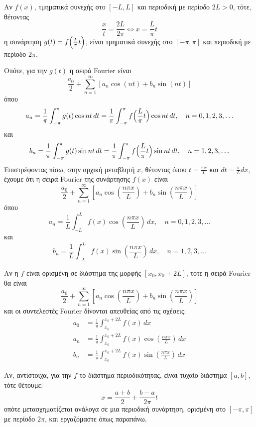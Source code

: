 \begin{rem}
  Αν $ f(x) $, τμηματικά συνεχής στο $ [-L, L] $ και περιοδική  με περίοδο 
  $ 2L>0 $, τότε, θέτοντας 
  \[ 
    \frac{x}{t} = \frac{2L}{2 \pi} \Leftrightarrow \boxed{x= \frac{L}{\pi} t}
  \]
  η συνάρτηση $ g(t) = f\Bigl(\frac{L}{\pi}t\Bigr) $, είναι τμηματικά συνεχής στο 
  $ [- \pi , \pi] $ και περιοδική με περίοδο $ 2 \pi $.
\end{rem}
Οπότε, για την $ g(t) $ η σειρά Fourier είναι 
\[
  \frac{a_{0}}{2} + \sum_{n=1}^{\infty} [a_{n} \cos{(nt)} + b_{n} \sin{(nt)}]
\] 
όπου 
\[
  a_{n} = \frac{1}{\pi} \int _{- \pi}^{\pi} g(t) \cos{nt} \,{dt} = 
  \frac{1}{\pi} \int _{- \pi}^{\pi} f\Bigl(\frac{L}{\pi} t\Bigr) \cos{nt} \,{dt}, 
  \quad n = 0,1,2,3, \ldots
\] 
και 
\[
  b_{n} = \frac{1}{\pi} \int _{- \pi}^{\pi} g(t) \sin{nt} \,{dt} = 
  \frac{1}{\pi} \int _{- \pi}^{\pi} f\Bigl(\frac{L}{\pi} t\Bigr) \sin{nt} \,{dt}, 
  \quad n = 1,2,3, \ldots
\]
Επιστρέφοντας πίσω, στην αρχική μεταβλητή $x$, θέτοντας όπου $ t = \frac{\pi x}{L} $ 
και $ dt = \frac{\pi}{L} dx $, έχουμε ότι η σειρά Fourier της συνάρτησης $ f(x) $ είναι
\[
  \boxed{\frac{a_{0}}{2} + \sum_{n=1}^{\infty} \left[a_{n} 
      \cos{\left(\frac{n \pi x}{L}\right)} + b_{n} 
  \sin{\left(\frac{n \pi x}{L}\right)} \right]}
\]
όπου 
\[
  a_{n} = \frac{1}{L} \int _{- L}^{L} f(x) 
  \cos{\left(\frac{n \pi x}{L}\right)} \,{dx}, \quad n = 0,1,2,3, \ldots
\] 
και 
\[
  b_{n} = \frac{1}{L} \int _{- L}^{L} f(x) 
  \sin{\left(\frac{n \pi x}{L}\right)} \,{dx}, \quad n = 1,2,3, \ldots
\]

\begin{rem}
  Αν η $f$ είναι ορισμένη σε διάστημα της μορφής $ [x_{0}, x_{0}+2L] $, 
  τότε η σειρά Fourier θα είναι 
  \[
    \frac{a_{0}}{2} + \sum_{n=1}^{\infty} \left[a_{n} 
      \cos{\left(\frac{n \pi x}{L}\right)} + b_{n} 
    \sin{\left(\frac{n \pi x}{L}\right)} \right]
  \]
  και οι συντελεστές Fourier δίνονται απευθείας από τις σχέσεις:
  \begin{align*}
    a_{0} &= \frac{1}{\pi} \int _{x_{0}}^{x_{0}+ 2 L}f(x) \,{dx} \\
    a_{n} &= \frac{1}{\pi} \int _{x_{0}}^{x_{0}+ 2 L} f(x) \cos{\left(\frac{n \pi x}{L}\right)} \,{dx}  \\
    b_{n} &= \frac{1}{\pi} \int _{x_{0}}^{x_{0}+ 2 L} f(x) \sin{\left(\frac{n \pi x}{L}\right)} \,{dx}  
  \end{align*} 
\end{rem}

\begin{rem}
  Αν, αντίστοιχα, για την $f$ το διάστημα περιοδικότητας, είναι τυχαίο διάστημα 
  $ [a,b] $, τότε θέτουμε:
  \[ 
    x = \frac{a+b}{2} + \frac{b-a}{2 \pi} t 
  \] 
  οπότε μετασχηματίζεται ανάλογα  σε μια περιοδική συνάρτηση, ορισμένη στο 
  $ [- \pi , \pi] $ με περίοδο $ 2 \pi $, και εργαζόμαστε όπως παραπάνω.
\end{rem}



